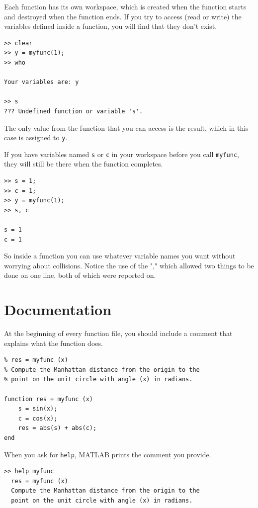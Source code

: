 \documentclass{book}
\begin{document}
Each function has its own workspace, which is created when the
function starts and destroyed when the function ends.  If you try to
access (read or write) the variables defined inside a function, you
will find that they don't exist.

\begin{verbatim}
>> clear
>> y = myfunc(1);
>> who

Your variables are: y

>> s
??? Undefined function or variable 's'.
\end{verbatim}

The only value from the function that you can access is the result,
which in this case is assigned to {\tt y}.

If you have variables named {\tt s} or {\tt c} in your workspace
before you call {\tt myfunc}, they will still be there when the
function completes.

\begin{verbatim}
>> s = 1;
>> c = 1;
>> y = myfunc(1);
>> s, c

s = 1
c = 1
\end{verbatim}

So inside a function you can use whatever variable names you
want without worrying about collisions.
Notice the use of the "," which allowed two things to be done on
one line, both of which were reported on.


\section{Documentation}

At the beginning of every function file, you should include a comment
that explains what the function does.

\begin{verbatim}
% res = myfunc (x)
% Compute the Manhattan distance from the origin to the
% point on the unit circle with angle (x) in radians.

function res = myfunc (x)
    s = sin(x);
    c = cos(x);
    res = abs(s) + abs(c);
end
\end{verbatim}

When you ask for {\tt help}, MATLAB prints the comment you
provide.

\begin{verbatim}
>> help myfunc
  res = myfunc (x)
  Compute the Manhattan distance from the origin to the
  point on the unit circle with angle (x) in radians.
\end{verbatim}
\end{document}
